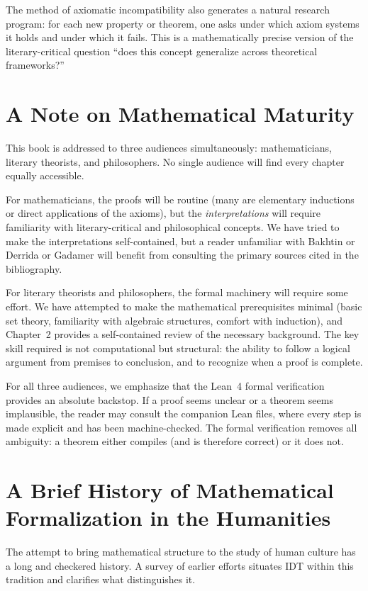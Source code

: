 \documentclass[11pt,openany]{book}
\theoremstyle{definition}
\theoremstyle{plain}
\theoremstyle{remark}
\begin{document}
The method of axiomatic incompatibility also generates a natural research program: for each new property or theorem, one asks under which axiom systems it holds and under which it fails. This is a mathematically precise version of the literary-critical question ``does this concept generalize across theoretical frameworks?''

\section{A Note on Mathematical Maturity}

This book is addressed to three audiences simultaneously: mathematicians, literary theorists, and philosophers. No single audience will find every chapter equally accessible.

For mathematicians, the proofs will be routine (many are elementary inductions or direct applications of the axioms), but the \emph{interpretations} will require familiarity with literary-critical and philosophical concepts. We have tried to make the interpretations self-contained, but a reader unfamiliar with Bakhtin or Derrida or Gadamer will benefit from consulting the primary sources cited in the bibliography.

For literary theorists and philosophers, the formal machinery will require some effort. We have attempted to make the mathematical prerequisites minimal (basic set theory, familiarity with algebraic structures, comfort with induction), and Chapter~2 provides a self-contained review of the necessary background. The key skill required is not computational but structural: the ability to follow a logical argument from premises to conclusion, and to recognize when a proof is complete.

For all three audiences, we emphasize that the Lean~4 formal verification provides an absolute backstop. If a proof seems unclear or a theorem seems implausible, the reader may consult the companion Lean files, where every step is made explicit and has been machine-checked. The formal verification removes all ambiguity: a theorem either compiles (and is therefore correct) or it does not.

\section{A Brief History of Mathematical Formalization in the Humanities}

The attempt to bring mathematical structure to the study of human culture has a long and checkered history. A survey of earlier efforts situates IDT within this tradition and clarifies what distinguishes it.
\end{document}
